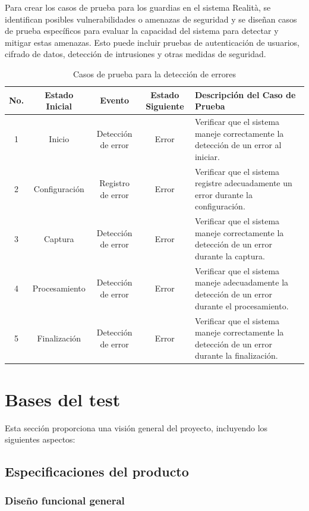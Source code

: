 \documentclass[12pt,a4paper, twoside]{article} %
\begin{document}
Para crear los casos de prueba para los guardias en el sistema Realità, se identifican posibles vulnerabilidades o amenazas de seguridad y se diseñan casos de prueba específicos para evaluar la capacidad del sistema para detectar y mitigar estas amenazas. Esto puede incluir pruebas de autenticación de usuarios, cifrado de datos, detección de intrusiones y otras medidas de seguridad.


\begin{table}[htbp]
    \centering
    \caption{Casos de prueba para la detección de errores}
    \label{tab:casos_prueba_errores}
    \begin{tabular}{|c|c|c|c|p{5cm}|}
    \hline
    \textbf{No.} & \textbf{Estado Inicial} & \textbf{Evento} & \textbf{Estado Siguiente} & \textbf{Descripción del Caso de Prueba} \\
    \hline
    1 & Inicio & Detección de error & Error & Verificar que el sistema maneje correctamente la detección de un error al iniciar. \\
    \hline
    2 & Configuración & Registro de error & Error & Verificar que el sistema registre adecuadamente un error durante la configuración. \\
    \hline
    3 & Captura & Detección de error & Error & Verificar que el sistema maneje correctamente la detección de un error durante la captura. \\
    \hline
    4 & Procesamiento & Detección de error & Error & Verificar que el sistema maneje adecuadamente la detección de un error durante el procesamiento. \\
    \hline
    5 & Finalización & Detección de error & Error & Verificar que el sistema maneje correctamente la detección de un error durante la finalización. \\
    \hline
    \end{tabular}
\end{table}


\section{Bases del test}
\label{sec:orgc1c4017}

Esta sección proporciona una visión general del proyecto, incluyendo los siguientes aspectos:


\subsection{Especificaciones del producto}
\subsubsection{Diseño funcional general}
\end{document}
